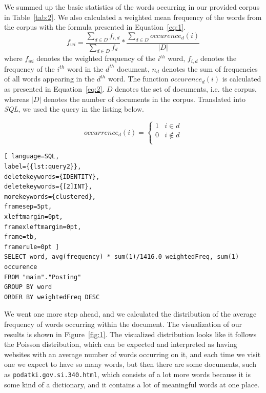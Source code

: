 \documentclass{article}
\begin{document}
We summed up the basic statistics of the words occurring in our provided corpus in Table~\ref{tab:2}. We also calculated a weighted mean frequency of the words from the corpus with the formula presented in Equation~\ref{eq:1}.
\begin{equation}\label{eq:1}
f_{wi} = \frac{\scriptstyle \sum_{d \in D} f_{i,d}}{\scriptstyle \sum_{d \in D} f_d} * \frac{\scriptstyle \sum_{d \in D} occurence_d(i)}{|D|}
\end{equation}
where $f_{wi}$ denotes the weighted frequency of the $i^{th}$ word, $f_{i,d}$ denotes the frequency of the $i^{th}$ word in the $d^{th}$ document, $n_d$ denotes the sum of frequencies of all words appearing in the $d^{th}$ word. The function $occurence_d(i)$ is calculated as presented in Equation~\ref{eq:2}. $D$ denotes the set of documents, i.e. the corpus, whereas $|D|$ denotes the number of documents in the corpus. Translated into \textit{SQL}, we used the query in the listing below.

\begin{equation} \label{eq:2}
occurrence_d(i)= \left\{
\begin{array}{ll}
1 & i \in d \\
0 & i \not\in d\\
\end{array} 
\right. 
\end{equation}

\begin{lstlisting}[ language=SQL,
label={{lst:query2}},
deletekeywords={IDENTITY},
deletekeywords={[2]INT},
morekeywords={clustered},
framesep=5pt,
xleftmargin=0pt,
framexleftmargin=0pt,
frame=tb,
framerule=0pt ]
SELECT word, avg(frequency) * sum(1)/1416.0 weightedFreq, sum(1) occurence
FROM "main"."Posting"
GROUP BY word
ORDER BY weightedFreq DESC
\end{lstlisting}

We went one more step ahead, and we calculated the distribution of the average frequency of words occurring within the document. The visualization of our results is shown in Figure~\ref{fig:1}. The visualized distribution looks like it follows the Poisson distribution, which can be expected and interpreted as having websites with an average number of words occurring on it, and each time we visit one we expect to have so many words, but then there are some documents, such as \texttt{podatki.gov.si.340.html}, which consists of a lot more words because it is some kind of a dictionary, and it contains a lot of meaningful words at one place.
\end{document}
